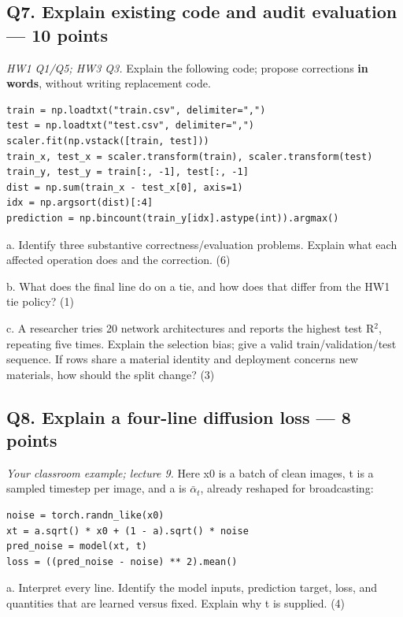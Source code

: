 \documentclass[11pt]{article}
\begin{document}
\subsection*{Q7. Explain existing code and audit evaluation — 10 points}

\emph{HW1 Q1/\allowbreak{}Q5; HW3 Q3.} Explain the following code; propose corrections \textbf{in words}, without writing replacement code.

\begin{lstlisting}
train = np.loadtxt("train.csv", delimiter=",")
test = np.loadtxt("test.csv", delimiter=",")
scaler.fit(np.vstack([train, test]))
train_x, test_x = scaler.transform(train), scaler.transform(test)
train_y, test_y = train[:, -1], test[:, -1]
dist = np.sum(train_x - test_x[0], axis=1)
idx = np.argsort(dist)[:4]
prediction = np.bincount(train_y[idx].astype(int)).argmax()
\end{lstlisting}

a. Identify three substantive correctness/\allowbreak{}evaluation problems. Explain what each affected operation does and the correction. (6)

b. What does the final line do on a tie, and how does that differ from the HW1 tie policy? (1)

c. A researcher tries 20 network architectures and reports the highest test R\ensuremath{{}^2}, repeating five times. Explain the selection bias; give a valid train/\allowbreak{}validation/\allowbreak{}test sequence. If rows share a material identity and deployment concerns new materials, how should the split change? (3)

\subsection*{Q8. Explain a four-line diffusion loss — 8 points}

\emph{Your classroom example; lecture 9.} Here x0 is a batch of clean images, t is a sampled timestep per image, and a is $\bar\alpha_t$, already reshaped for broadcasting:

\begin{lstlisting}
noise = torch.randn_like(x0)
xt = a.sqrt() * x0 + (1 - a).sqrt() * noise
pred_noise = model(xt, t)
loss = ((pred_noise - noise) ** 2).mean()
\end{lstlisting}

a. Interpret every line. Identify the model inputs, prediction target, loss, and quantities that are learned versus fixed. Explain why t is supplied. (4)
\end{document}
